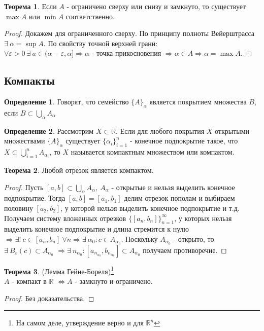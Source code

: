 \documentclass[a4paper, 12pt]{article}
\newcommand{\R}{\mathbb{R}}
\renewcommand{\epsilon}{\varepsilon}
\theoremstyle{definition}
\newtheorem*{definition}{Определение}
\newtheorem*{theorem}{Теорема}
\begin{document}
        \begin{theorem}
            Если $A$ - ограничено сверху или снизу и замкнуто, то существует $\max{A}$ или $\min{A}$ соответственно.
        \end{theorem} 
        \begin{proof}
            Докажем для ограниченного сверху. По принципу полноты Вейерштрасса $\exists\ \alpha=\sup{A}$. По свойству точной верхней грани:\\
            $\forall\epsilon>0\ \exists\ a\in (\alpha-\epsilon, \alpha]\Rightarrow \alpha$ - точка прикосновения $\Rightarrow \alpha \in A\Rightarrow \alpha=\max{A}$.
        \end{proof}
    \subsection{Компакты}
        \begin{definition}
            Говорят, что семейство $\{A\}_{\alpha}$ является покрытием множества $B$, если $B\subset \bigcup\limits_{\alpha}A_{\alpha}$
        \end{definition} 
        \begin{definition}
            Рассмотрим $X\subset \R$. Если для любого покрытия $X$ открытыми множествами $\{A\}_{\alpha}$ существует $\{\alpha_i\}_{i=1}^n$ - конечное подпокрытие такое, что \\
            $X\subset \bigcup\limits_{i=1}^n A_{\alpha_i}$, то $X$ называется компактным множеством или компактом.
        \end{definition} 
        \begin{theorem}
            Любой отрезок является компактом.
        \end{theorem} 
        \begin{proof}
            Пусть $[a,b]\subset \bigcup\limits_{\alpha}A_{\alpha},\ A_{\alpha}$ - открытые и нельзя выделить конечное подпокрытие. Тогда $[a,b]=[a_1,b_1]$ делим отрезок пополам и выбираем половину $[a_2,b_2]$, у которой нельзя выделить конечное подпокрытие и т.д. Получаем систему вложенных отрезков $\{[a_n,b_n]\}_{n=1}^{\infty}$, у которых нельзя выделить конечное подпокрытие и длина стремится к нулю $\Rightarrow \exists!\ c\in [a_n,b_n]\ \forall n \Rightarrow \exists\ \alpha_0: c\in A_{\alpha_0}$. Поскольку $A_{\alpha_0}$ - открыто, то $\exists\ B_{\epsilon}(c)\subset A_{\alpha_0}$ $\Rightarrow \exists\ n_{\alpha_0}: [a_{n_{\alpha_0}},b_{n_{\alpha_0}}]\subset A_{\alpha_0}$ получаем противоречие.
        \end{proof} 
        \begin{theorem} (Лемма Гейне-Бореля)\footnote{На самом деле, утверждение верно и для $\R^n$}\\
            $A$ - компакт в $\R$ $\Leftrightarrow A$ - замкнуто и ограничено.
        \end{theorem} 
        \begin{proof}
            Без доказательства.
        \end{proof}
\end{document}
